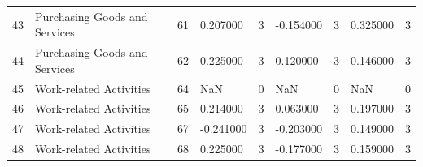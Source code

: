 \begin{tabular}{lllllllll}
43 & Purchasing Goods and Services & 61 & 0.207000 & 3 & -0.154000 & 3 & 0.325000 & 3 \\
44 & Purchasing Goods and Services & 62 & 0.225000 & 3 & 0.120000 & 3 & 0.146000 & 3 \\
45 & Work-related Activities & 64 & NaN & 0 & NaN & 0 & NaN & 0 \\
46 & Work-related Activities & 65 & 0.214000 & 3 & 0.063000 & 3 & 0.197000 & 3 \\
47 & Work-related Activities & 67 & -0.241000 & 3 & -0.203000 & 3 & 0.149000 & 3 \\
48 & Work-related Activities & 68 & 0.225000 & 3 & -0.177000 & 3 & 0.159000 & 3 \\
\bottomrule
\end{tabular}
